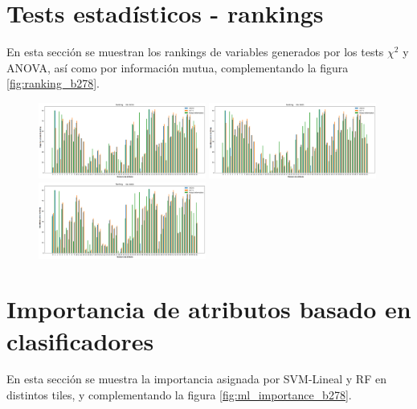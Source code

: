 \begin{appendix}
\newpage

\section{Tests estadísticos - rankings}
\label{anexo_b_rankings}
 En esta sección se muestran los rankings de variables generados por los tests $\chi^2$ y ANOVA, así como por información mutua, complementando la figura \ref{fig:ranking_b278}.
 
\begin{figure}[h!]
\centering
  \includegraphics[width=0.49\textwidth]{Kap6/test=b234_variable_importance_ranking.png} 
  \includegraphics[width=0.49\textwidth]{Kap6/test=b261_variable_importance_ranking.png}  \\
  \includegraphics[width=0.49\textwidth]{Kap6/test=b360_variable_importance_ranking.png} 
\end{figure}

\section{Importancia de atributos basado en clasificadores}
\label{anexo_ml_scores}
 En esta sección se muestra la importancia asignada por SVM-Lineal y RF en distintos tiles, y complementando la figura \ref{fig:ml_importance_b278}.
 

\end{appendix}
